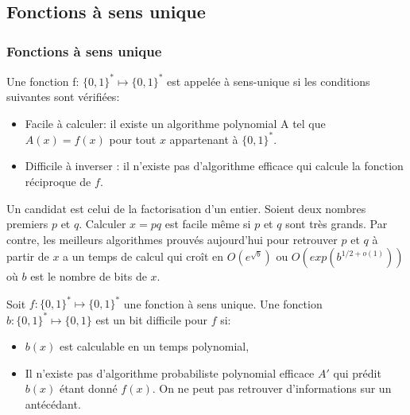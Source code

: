 \documentclass[utf8,10pt,french]{beamer}
\begin{document}
\subsection{Fonctions à sens unique}
\begin{frame}
 \frametitle{Fonctions à sens unique}
\begin{definition}
Une fonction f: $\{0,1\}^* \longmapsto \{0,1\}^*$ est appelée à sens-unique si les conditions suivantes sont vérifiées:
\begin{itemize}
\item Facile à calculer: il existe un algorithme polynomial A tel que $A(x) = f(x)$ pour tout $x$ appartenant à $\{0,1\}^*$.
\item Difficile à inverser : il n'existe pas d'algorithme efficace qui calcule la fonction réciproque de $f$.
\end{itemize}
\end{definition} \pause
\begin{example}
Un candidat est celui de la factorisation d'un entier. Soient deux nombres premiers $p$ et $q$. Calculer $x=pq$ est facile même si 
$p$ et $q$ sont très grands. Par contre, les meilleurs algorithmes prouvés aujourd'hui pour retrouver $p$ et $q$ à partir de $x$ a un temps de calcul qui cro{\^i}t en $O(e^{\sqrt{b}})$ ou $O(exp(b^{1/2 + o(1)}))$ où $b$ est le nombre de bits de $x$.
\end{example}
\end{frame}

\begin{frame}
\begin{definition}
Soit $f: \{0,1\}^* \longmapsto \{0,1\}^*$ une fonction à sens unique. Une fonction $b: \{0,1\}^* \longmapsto \{0,1\}$ est un bit difficile pour $f$ si:
\begin{itemize}
\item $b(x)$ est calculable en un temps polynomial,
\item Il n'existe pas d'algorithme probabiliste polynomial efficace $A'$ qui prédit $b(x)$ étant donné $f(x)$. On ne peut pas retrouver d'informations sur un antécédant.
\end{itemize}
\end{definition} 
\end{frame}
\end{document}
